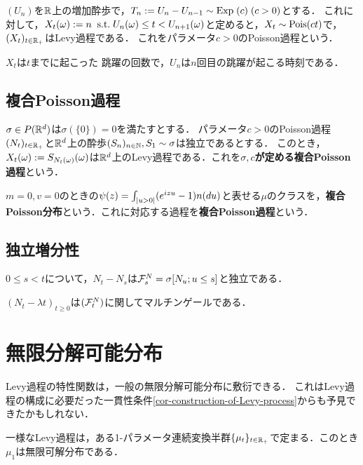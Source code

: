 \documentclass[uplatex,dvipdfmx]{jsreport}
\begin{document}
\begin{theorem}
    $(U_n)$を$\mathbb{R}$上の増加酔歩で，$T_n:=U_n-U_{n-1}\sim\mathrm{Exp}\;(c)\;(c>0)$とする．
    これに対して，$X_t(\omega):=n\;\;\mathrm{s.t.}\; U_n(\omega)\le t<U_{n+1}(\omega)$と定めると，$X_t\sim\mathrm{Pois}(ct)$で，$(X_t)_{t\in\mathbb{R}_+}$はLevy過程である．
    これをパラメータ$c>0$のPoisson過程という．
\end{theorem}
\begin{remarks}
    $X_t$は$t$までに起こった
    跳躍の回数で，$U_n$は$n$回目の跳躍が起こる時刻である．
\end{remarks}

\subsection{複合Poisson過程}

\begin{theorem}
    $\sigma\in P(\mathbb{R}^d)$は$\sigma(\{0\})=0$を満たすとする．
    パラメータ$c>0$のPoisson過程$(N_t)_{t\in\mathbb{R}_+}$と$\mathbb{R}^d$上の酔歩$(S_n)_{n\in\mathbb{N}},S_1\sim\sigma$は独立であるとする．
    このとき，$X_t(\omega):=S_{N_t(\omega)}(\omega)$は$\mathbb{R}^d$上のLevy過程である．これを\textbf{$\sigma,c$が定める複合Poisson過程}という．
\end{theorem}

\begin{definition}
        $m=0,v=0$のときの$\psi(z)=\int_{\lvert u>0\rvert}(e^{izu}-1)n(du)$と表せる$\mu$のクラスを，\textbf{複合Poisson分布}という．これに対応する過程を\textbf{複合Poisson過程}という．
\end{definition}

\subsection{独立増分性}

\begin{proposition}
    $0\le s<t$について，$N_t-N_s$は$\mathcal{F}^N_s=\sigma[N_u;u\le s]$と独立である．
\end{proposition}

\begin{corollary}
    $(N_t-\lambda t)_{t\ge0}$は$(\mathcal{F}_t^N)$に関してマルチンゲールである．
\end{corollary}

\section{無限分解可能分布}

\begin{tcolorbox}[colframe=ForestGreen, colback=ForestGreen!10!white,breakable,colbacktitle=ForestGreen!40!white,coltitle=black,fonttitle=\bfseries\sffamily,
title=]
    Levy過程の特性関数は，一般の無限分解可能分布に敷衍できる．
    これはLevy過程の構成に必要だった一貫性条件\ref{cor-construction-of-Levy-process}からも予見できたかもしれない．

    一様なLevy過程は，ある1-パラメータ連続変換半群$\{\mu_t\}_{t\in\mathbb{R}_+}$で定まる．このとき$\mu_1$は無限可解分布である．
\end{tcolorbox}
\end{document}
